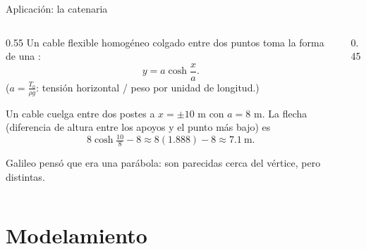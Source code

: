 \documentclass[10pt,aspectratio=169]{beamer}
\begin{document}
\begin{frame}{Aplicación: la catenaria}
  \begin{columns}
    \begin{column}{0.55\textwidth}
      Un cable flexible homogéneo colgado entre dos puntos toma la forma de una :
      \[ y=a\cosh\frac xa. \]
      ($a=\frac{T_0}{\rho g}$: tensión horizontal / peso por unidad de longitud.)
      \begin{ejemplo}
        Un cable cuelga entre dos postes a $x=\pm10$ m con $a=8$ m. La flecha (diferencia de altura entre los apoyos y el punto más bajo) es
        \[ 8\cosh\tfrac{10}{8}-8\approx8(1.888)-8\approx7.1\ \text{m}. \]
      \end{ejemplo}
      \small Galileo pensó que era una parábola: son parecidas cerca del vértice, pero distintas.
    \end{column}
    \begin{column}{0.45\textwidth}
      \centering
    \end{column}
  \end{columns}
\end{frame}

\section{Modelamiento}
\end{document}
